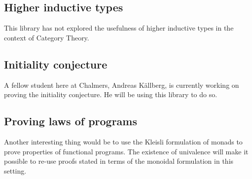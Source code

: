 \subsection{Higher inductive types}
This library has not explored the usefulness of higher inductive types
in the context of Category Theory.

\subsection{Initiality conjecture}
A fellow student here at Chalmers, Andreas Källberg, is currently
working on proving the initiality conjecture. He will
be using this library to do so.

\subsection{Proving laws of programs}
Another interesting thing would be to use the Kleisli formulation of
monads to prove properties of functional programs. The existence of
univalence will make it possible to re-use proofs stated in terms of
the monoidal formulation in this setting.
